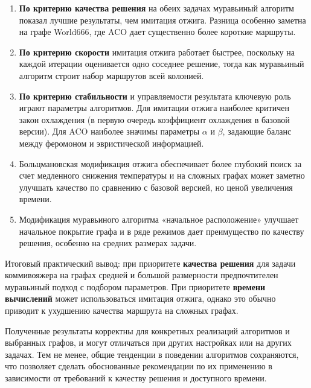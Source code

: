 \documentclass[12pt,a4paper]{article}
\begin{document}
\begin{enumerate}
    \item \textbf{По критерию качества решения} на обеих задачах муравьиный алгоритм
    показал лучшие результаты, чем имитация отжига. Разница особенно заметна на
    графе World666, где ACO дает существенно более короткие маршруты.

    \item \textbf{По критерию скорости} имитация отжига работает быстрее,
    поскольку на каждой итерации оценивается одно соседнее решение, тогда как
    муравьиный алгоритм строит набор маршрутов всей колонией.

    \item \textbf{По критерию стабильности} и управляемости результата ключевую роль
    играют параметры алгоритмов. Для имитации отжига наиболее критичен закон
    охлаждения (в первую очередь коэффициент охлаждения в базовой версии). Для ACO
    наиболее значимы параметры $\alpha$ и $\beta$, задающие баланс между феромоном и
    эвристической информацией.

    \item Больцмановская модификация отжига обеспечивает более глубокий поиск
    за счет медленного снижения температуры и на сложных графах может заметно
    улучшать качество по сравнению с базовой версией, но ценой увеличения времени.

    \item Модификация муравьиного алгоритма «начальное расположение» улучшает
    начальное покрытие графа и в ряде режимов дает преимущество по качеству
    решения, особенно на средних размерах задачи.
\end{enumerate}

Итоговый практический вывод: при приоритете \textbf{качества решения} для задачи
коммивояжера на графах средней и большой размерности предпочтителен муравьиный
подход с подбором параметров. При приоритете \textbf{времени вычислений} может
использоваться имитация отжига, однако это обычно приводит к ухудшению качества
маршрута на сложных графах.

Полученные результаты корректны для конкретных реализаций алгоритмов и выбранных графов,
и могут отличаться при других настройках или на других задачах.
Тем не менее, общие тенденции в поведении алгоритмов сохраняются, что позволяет сделать
обоснованные рекомендации по их применению в зависимости от требований к качеству
решения и доступного времени.

\pagebreak
\end{document}
